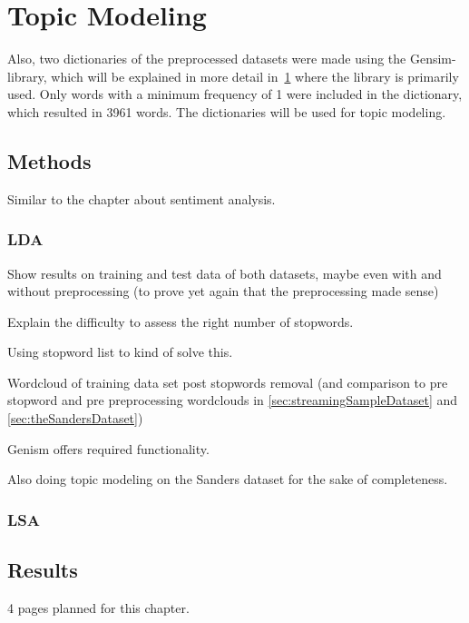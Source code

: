 \chapter{Topic Modeling}
\label{ch:topicModeling}


Also, two dictionaries of the preprocessed datasets were made using the Gensim-library,
which will be explained in more detail in~\ref{ch:topicModeling} where the library is primarily used.
Only words with a minimum frequency of 1 were included in the dictionary, which resulted in 3961 words.
The dictionaries will be used for topic modeling.

\section{Methods}
\label{sec:methods}

Similar to the chapter about sentiment analysis.

\subsection{LDA}
\label{subsec:lda}

Show results on training and test data of both datasets, maybe even with and without preprocessing (to prove yet again that the preprocessing made sense)

Explain the difficulty to assess the right number of stopwords.

Using stopword list to kind of solve this.%

Wordcloud of training data set post stopwords removal (and comparison to pre stopword and pre preprocessing wordclouds in \ref{sec:streamingSampleDataset} and \ref{sec:theSandersDataset})

Genism offers required functionality. %

Also doing topic modeling on the Sanders dataset for the sake of completeness.

\subsection{LSA}
\label{subsec:lsa}

\section{Results}
\label{sec:results}


4 pages planned for this chapter.
\pagebreak[4]